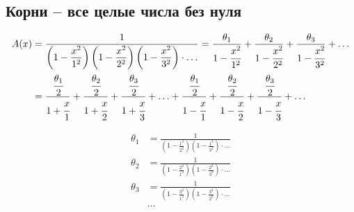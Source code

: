 
\subsection{Корни -- все целые числа без нуля}

\begin{equation*} \begin{aligned}
A(x) &=
\frac{1}
{
  \left(1 - \displaystyle \frac{x^2}{1^2} \right)
  \left(1 - \displaystyle \frac{x^2}{2^2} \right)
  \left(1 - \displaystyle \frac{x^2}{3^2} \right)
  \cdot \ldots
}
= \frac{\theta_1}{1 - \cfrac{x^2}{1^2}}
+ \frac{\theta_2}{1 - \cfrac{x^2}{2^2}}
+ \frac{\theta_3}{1 - \cfrac{x^2}{3^2}}
+ \ldots \\ &
= \frac{\cfrac{\theta_1}{2}}{1 + \cfrac{x}{1}}
+ \frac{\cfrac{\theta_2}{2}}{1 + \cfrac{x}{2}}
+ \frac{\cfrac{\theta_3}{2}}{1 + \cfrac{x}{3}}
+ \ldots
+ \frac{\cfrac{\theta_1}{2}}{1 - \cfrac{x}{1}}
+ \frac{\cfrac{\theta_2}{2}}{1 - \cfrac{x}{2}}
+ \frac{\cfrac{\theta_3}{2}}{1 - \cfrac{x}{3}}
+ \ldots \\
\end{aligned} \end{equation*}

\begin{equation*} \begin{aligned}
\theta_1 &= \frac{1}
{
  \left(1 - \displaystyle \frac{1^2}{2^2} \right)
  \left(1 - \displaystyle \frac{1^2}{3^2} \right)
  \cdot \ldots
} \\
\theta_2 &= \frac{1}
{
  \left(1 - \displaystyle \frac{2^2}{1^2} \right)
  \left(1 - \displaystyle \frac{2^2}{3^2} \right)
  \cdot \ldots
} \\
\theta_3 &= \frac{1}
{
  \left(1 - \displaystyle \frac{3^2}{1^2} \right)
  \left(1 - \displaystyle \frac{3^2}{2^2} \right)
  \cdot \ldots
} \\
&\ldots \\
\end{aligned} \end{equation*}

